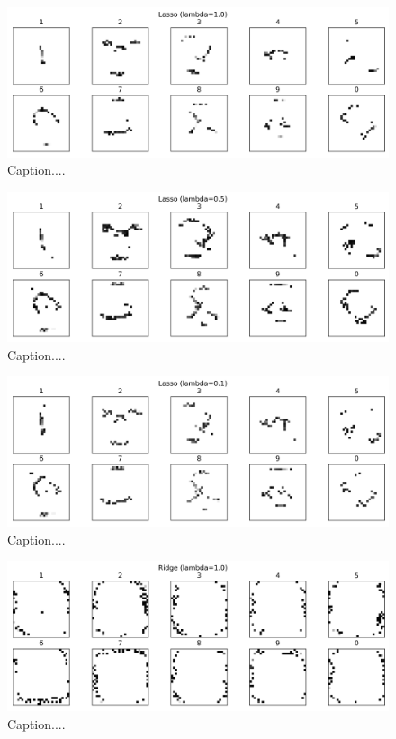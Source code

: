 \documentclass[10pt]{article}
\begin{document}
\begin{figure}[ht]
\centerline{\includegraphics[scale=0.75]{figures/weight_matrix_lasso_1_geq_90th_no_zeros.png}}
\caption{Caption....}
\label{fig16}
\end{figure}

\begin{figure}[ht]
\centerline{\includegraphics[scale=0.75]{figures/weight_matrix_lasso_05_geq_90th_no_zeros.png}}
\caption{Caption....}
\label{fig17}
\end{figure}

\begin{figure}[ht]
\centerline{\includegraphics[scale=0.75]{figures/weight_matrix_lasso_01_geq_90th_no_zeros.png}}
\caption{Caption....}
\label{fig18}
\end{figure}

\begin{figure}[ht]
\centerline{\includegraphics[scale=0.75]{figures/weight_matrix_ridge_geq_90th_no_zeros.png}}
\caption{Caption....}
\label{fig19}
\end{figure}
\end{document}
